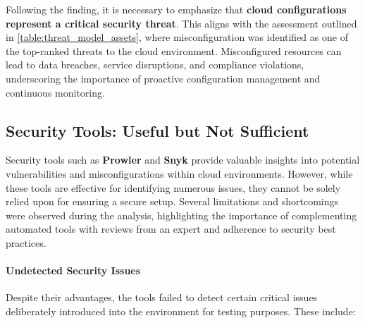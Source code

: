 Following the finding, it is necessary to emphasize that \textbf{cloud configurations represent a critical security threat}. This aligns with the assessment outlined in \ref{table:threat_model_assets}, where misconfiguration was identified as one of the top-ranked threats to the cloud environment. Misconfigured resources can lead to data breaches, service disruptions, and compliance violations, underscoring the importance of proactive configuration management and continuous monitoring.


\subsection{Security Tools: Useful but Not Sufficient}

Security tools such as \textbf{Prowler} and \textbf{Snyk} provide valuable insights into potential vulnerabilities and misconfigurations within cloud environments. However, while these tools are effective for identifying numerous issues, they cannot be solely relied upon for ensuring a secure setup. Several limitations and shortcomings were observed during the analysis, highlighting the importance of complementing automated tools with reviews from an expert and adherence to security best practices.

\paragraph{Undetected Security Issues}

Despite their advantages, the tools failed to detect certain critical issues deliberately introduced into the environment for testing purposes. These include:

